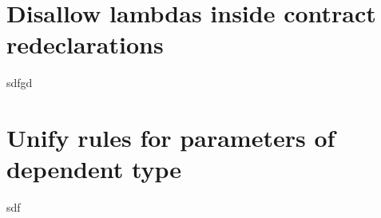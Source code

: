 \section{Disallow lambdas inside contract redeclarations}

sdfgd

\section{Unify rules for parameters of dependent type}

sdf



\renewcommand{\addcontentsline}[3]{}%







